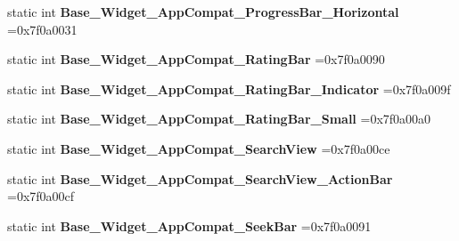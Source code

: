 \begin{DoxyCompactItemize}
\item 
\mbox{\label{classandroid_1_1support_1_1v7_1_1recyclerview_1_1R_1_1style_aee6d76aefa94c4a90407ef379bfe5e25}} 
static int {\bfseries Base\+\_\+\+Widget\+\_\+\+App\+Compat\+\_\+\+Progress\+Bar\+\_\+\+Horizontal} =0x7f0a0031
\item 
\mbox{\label{classandroid_1_1support_1_1v7_1_1recyclerview_1_1R_1_1style_a42ef191c61e5d2495d99fd4e01dbcc65}} 
static int {\bfseries Base\+\_\+\+Widget\+\_\+\+App\+Compat\+\_\+\+Rating\+Bar} =0x7f0a0090
\item 
\mbox{\label{classandroid_1_1support_1_1v7_1_1recyclerview_1_1R_1_1style_ac012e12876279ce2a49d93ec41826199}} 
static int {\bfseries Base\+\_\+\+Widget\+\_\+\+App\+Compat\+\_\+\+Rating\+Bar\+\_\+\+Indicator} =0x7f0a009f
\item 
\mbox{\label{classandroid_1_1support_1_1v7_1_1recyclerview_1_1R_1_1style_abaaa46e4e73d18a2e333fc609ee90c94}} 
static int {\bfseries Base\+\_\+\+Widget\+\_\+\+App\+Compat\+\_\+\+Rating\+Bar\+\_\+\+Small} =0x7f0a00a0
\item 
\mbox{\label{classandroid_1_1support_1_1v7_1_1recyclerview_1_1R_1_1style_accd80ac7aa5b3b4aca2481e960b6a658}} 
static int {\bfseries Base\+\_\+\+Widget\+\_\+\+App\+Compat\+\_\+\+Search\+View} =0x7f0a00ce
\item 
\mbox{\label{classandroid_1_1support_1_1v7_1_1recyclerview_1_1R_1_1style_a7f0e24d411813bc7505dd5c2580ed8e2}} 
static int {\bfseries Base\+\_\+\+Widget\+\_\+\+App\+Compat\+\_\+\+Search\+View\+\_\+\+Action\+Bar} =0x7f0a00cf
\item 
\mbox{\label{classandroid_1_1support_1_1v7_1_1recyclerview_1_1R_1_1style_af4baafdd0f2785b030d1d2a4c53702ce}} 
static int {\bfseries Base\+\_\+\+Widget\+\_\+\+App\+Compat\+\_\+\+Seek\+Bar} =0x7f0a0091
\item 

\end{DoxyCompactItemize}
